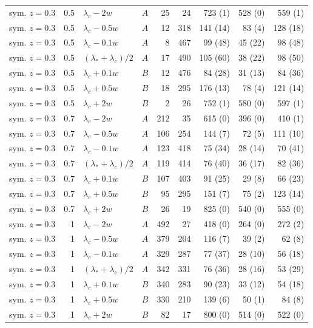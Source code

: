 \begin{longtable}{@{}lrllrrrrr@{}}
sym. $z{=}0.3$ & 0.5 & $\lambda_c-2w$ & $A$ & 25 & 24 & 723 (1) & 528 (0) & 559 (1)\\
sym. $z{=}0.3$ & 0.5 & $\lambda_c-0.5w$ & $A$ & 12 & 318 & 141 (14) & 83 (4) & 128 (18)\\
sym. $z{=}0.3$ & 0.5 & $\lambda_c-0.1w$ & $A$ & 8 & 467 & 99 (48) & 45 (22) & 98 (48)\\
sym. $z{=}0.3$ & 0.5 & $(\lambda_*+\lambda_c)/2$ & $A$ & 17 & 490 & 105 (60) & 38 (22) & 98 (50)\\
sym. $z{=}0.3$ & 0.5 & $\lambda_c+0.1w$ & $B$ & 12 & 476 & 84 (28) & 31 (13) & 84 (36)\\
sym. $z{=}0.3$ & 0.5 & $\lambda_c+0.5w$ & $B$ & 18 & 295 & 176 (13) & 78 (4) & 121 (14)\\
sym. $z{=}0.3$ & 0.5 & $\lambda_c+2w$ & $B$ & 2 & 26 & 752 (1) & 580 (0) & 597 (1)\\
sym. $z{=}0.3$ & 0.7 & $\lambda_c-2w$ & $A$ & 212 & 35 & 615 (0) & 396 (0) & 410 (1)\\
sym. $z{=}0.3$ & 0.7 & $\lambda_c-0.5w$ & $A$ & 106 & 254 & 144 (7) & 72 (5) & 111 (10)\\
sym. $z{=}0.3$ & 0.7 & $\lambda_c-0.1w$ & $A$ & 123 & 418 & 75 (34) & 28 (14) & 70 (41)\\
sym. $z{=}0.3$ & 0.7 & $(\lambda_*+\lambda_c)/2$ & $A$ & 119 & 414 & 76 (40) & 36 (17) & 82 (36)\\
sym. $z{=}0.3$ & 0.7 & $\lambda_c+0.1w$ & $B$ & 107 & 403 & 91 (25) & 29 (8) & 66 (23)\\
sym. $z{=}0.3$ & 0.7 & $\lambda_c+0.5w$ & $B$ & 95 & 295 & 151 (7) & 75 (2) & 123 (14)\\
sym. $z{=}0.3$ & 0.7 & $\lambda_c+2w$ & $B$ & 26 & 19 & 825 (0) & 540 (0) & 555 (0)\\
sym. $z{=}0.3$ & 1 & $\lambda_c-2w$ & $A$ & 492 & 27 & 418 (0) & 264 (0) & 272 (2)\\
sym. $z{=}0.3$ & 1 & $\lambda_c-0.5w$ & $A$ & 379 & 204 & 116 (7) & 39 (2) & 62 (8)\\
sym. $z{=}0.3$ & 1 & $\lambda_c-0.1w$ & $A$ & 329 & 287 & 77 (37) & 28 (10) & 56 (18)\\
sym. $z{=}0.3$ & 1 & $(\lambda_*+\lambda_c)/2$ & $A$ & 342 & 331 & 76 (36) & 28 (16) & 53 (29)\\
sym. $z{=}0.3$ & 1 & $\lambda_c+0.1w$ & $B$ & 340 & 283 & 90 (23) & 33 (12) & 54 (18)\\
sym. $z{=}0.3$ & 1 & $\lambda_c+0.5w$ & $B$ & 330 & 210 & 139 (6) & 50 (1) & 84 (8)\\
sym. $z{=}0.3$ & 1 & $\lambda_c+2w$ & $B$ & 82 & 17 & 800 (0) & 514 (0) & 522 (0)\\

\end{longtable}
